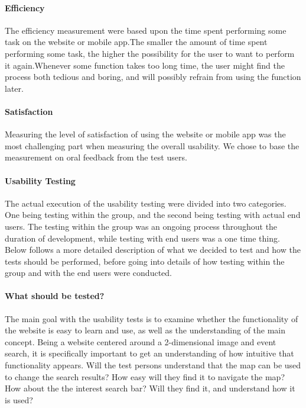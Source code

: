 \paragraph{Efficiency} The efficiency measurement were based upon the time spent performing some task on the website or mobile app.The smaller the amount of time spent performing some task, the higher the possibility for the user to want to perform it again.Whenever some function takes too long time, the user might find the process both tedious and boring, and will possibly refrain from using the function later.

\paragraph{Satisfaction} Measuring the level of satisfaction of using the website or mobile app was the most challenging part when measuring the overall usability. We chose to base the measurement on oral feedback from the test users.

\paragraph{Usability Testing} The actual execution of the usability testing were divided into two categories. One being testing within the group, and the second being testing with actual end users. The testing within the group was an ongoing process throughout the duration of development, while testing with end users was a one time thing. Below follows a more detailed description of what we decided to test and how the tests should be performed, before going into details of how testing within the group and with the end users were conducted.

\paragraph{What should be tested?} The main goal with the usability tests is to examine whether the functionality of the website is easy to learn and use, as well as the understanding of the main concept. Being a website centered around a 2-dimensional image and event search, it is specifically important to get an understanding of how intuitive that functionality appears. Will the test persons understand that the map can be used to change the search results? How easy will they find it to navigate the map? How about the the interest search bar? Will they find it, and understand how it is used?

